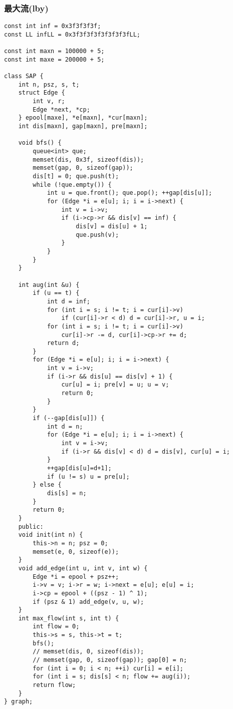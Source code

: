 \subsubsection{最大流(lby)}
\begin{verbatim}
const int inf = 0x3f3f3f3f;
const LL infLL = 0x3f3f3f3f3f3f3f3fLL;

const int maxn = 100000 + 5;
const int maxe = 200000 + 5;

class SAP {
    int n, psz, s, t;
    struct Edge {
        int v, r;
        Edge *next, *cp;
    } epool[maxe], *e[maxn], *cur[maxn];
    int dis[maxn], gap[maxn], pre[maxn];

    void bfs() {
        queue<int> que;
        memset(dis, 0x3f, sizeof(dis));
        memset(gap, 0, sizeof(gap));
        dis[t] = 0; que.push(t);
        while (!que.empty()) {
            int u = que.front(); que.pop(); ++gap[dis[u]];
            for (Edge *i = e[u]; i; i = i->next) {
                int v = i->v;
                if (i->cp->r && dis[v] == inf) {
                    dis[v] = dis[u] + 1;
                    que.push(v);
                }
            }
        }
    }

    int aug(int &u) {
        if (u == t) {
            int d = inf;
            for (int i = s; i != t; i = cur[i]->v)
                if (cur[i]->r < d) d = cur[i]->r, u = i;
            for (int i = s; i != t; i = cur[i]->v)
                cur[i]->r -= d, cur[i]->cp->r += d;
            return d;
        }
        for (Edge *i = e[u]; i; i = i->next) {
            int v = i->v;
            if (i->r && dis[u] == dis[v] + 1) {
                cur[u] = i; pre[v] = u; u = v;
                return 0;
            }
        }
        if (--gap[dis[u]]) {
            int d = n;
            for (Edge *i = e[u]; i; i = i->next) {
                int v = i->v;
                if (i->r && dis[v] < d) d = dis[v], cur[u] = i;
            }
            ++gap[dis[u]=d+1];
            if (u != s) u = pre[u];
        } else {
            dis[s] = n;
        }
        return 0;
    }
    public:
    void init(int n) {
        this->n = n; psz = 0;
        memset(e, 0, sizeof(e));
    }
    void add_edge(int u, int v, int w) {
        Edge *i = epool + psz++;
        i->v = v; i->r = w; i->next = e[u]; e[u] = i;
        i->cp = epool + ((psz - 1) ^ 1);
        if (psz & 1) add_edge(v, u, w);
    }
    int max_flow(int s, int t) {
        int flow = 0;
        this->s = s, this->t = t;
        bfs();
        // memset(dis, 0, sizeof(dis));
        // memset(gap, 0, sizeof(gap)); gap[0] = n;
        for (int i = 0; i < n; ++i) cur[i] = e[i];
        for (int i = s; dis[s] < n; flow += aug(i));
        return flow;
    }
} graph;
\end{verbatim}
